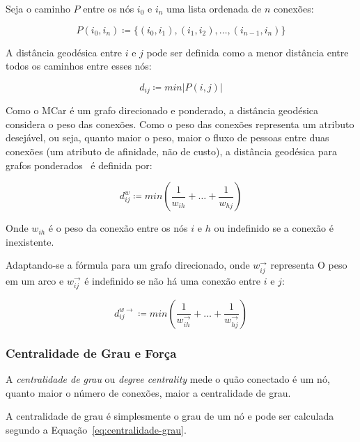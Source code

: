 \documentclass[12pt,a4paper,final]{article}
\newcommand{\defn}{\coloneqq} %
\newcommand{\wout}{w^\rightarrow} %
\newcommand{\weighted}[1]{#1^w} %
\newcommand{\weighteddir}[1]{#1^{w\rightarrow}} %
\begin{document}
Seja o caminho $P$ entre os nós $i_0$ e $i_n$ uma lista ordenada de $n$ conexões:

\begin{equation} \label{eq:caminho}
P(i_0,i_n) \defn \{(i_0,i_1), (i_1,i_2), \ldots, (i_{n-1},i_n)\}
\end{equation}

A distância geodésica entre $i$ e $j$ pode ser definida como a menor distância entre todos os caminhos entre esses nós:

\begin{equation} \label{eq:distancia-geodesica}
d_{ij} \defn min|P(i, j)| 
\end{equation}

Como o MCar é um grafo direcionado e ponderado, a distância geodésica considera o peso das conexões. Como o peso das conexões representa um atributo desejável, ou seja, quanto maior o peso, maior o fluxo de pessoas entre duas conexões (um atributo de afinidade, não de custo),  a distância geodésica para grafos ponderados~\cite{Newman2001-sl} é definida por:

\begin{equation} \label{eq:distancia-ponderada}
\weighted{d}_{ij} \defn min\left(\frac{1}{w_{ih}} + \ldots + \frac{1}{w_{hj}}\right)
\end{equation}

Onde $w_{ih}$ é o peso da conexão entre os nós $i$ e $h$ ou indefinido se a conexão é inexistente.

Adaptando-se a fórmula para um grafo direcionado, onde $\wout_{ij}$ representa O peso em um arco e $\wout_{ij}$ é indefinido se não há uma conexão entre $i$ e $j$:

\begin{equation} \label{eq:distancia-ponderada-direcionada}
\weighteddir{d}_{ij} \defn min\left(\frac{1}{\wout_{ih}} + \ldots + \frac{1}{\wout_{hj}}\right)
\end{equation}

\subsubsection{Centralidade de Grau e Força} \label{sec:forca}

A \textit{centralidade de grau} ou \textit{degree centrality} mede o quão conectado é um nó, quanto maior o número de conexões, maior a centralidade de grau.

A centralidade de grau é simplesmente o grau de um nó e pode ser calculada segundo a Equação~\ref{eq:centralidade-grau}.
\end{document}
